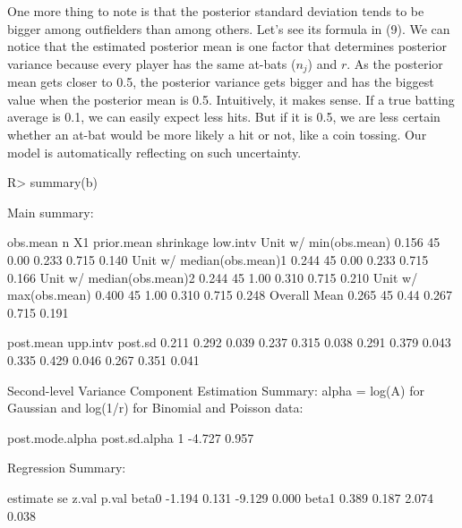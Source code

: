 \documentclass[article]{jss}
\begin{document}
One more thing to note is that the posterior standard deviation tends to be bigger among outfielders than among others. Let's see its formula in (9). We can notice that the estimated posterior mean is one factor that determines posterior variance because every player has the same at-bats ($n_{j}$) and $r$. As the posterior mean gets closer to 0.5, the posterior variance gets bigger and has the biggest value when the posterior mean is 0.5. Intuitively, it makes sense. If a true batting average is 0.1, we can easily expect less hits. But if it is 0.5, we are less certain whether an at-bat would be more likely a hit or not, like a coin tossing. Our model is automatically reflecting on such uncertainty.
\begin{CodeChunk}
\begin{CodeInput}
R> summary(b)
\end{CodeInput}
\begin{CodeOutput}
Main summary:

                          obs.mean  n   X1 prior.mean shrinkage low.intv
Unit w/ min(obs.mean)        0.156 45 0.00      0.233     0.715    0.140
Unit w/ median(obs.mean)1    0.244 45 0.00      0.233     0.715    0.166
Unit w/ median(obs.mean)2    0.244 45 1.00      0.310     0.715    0.210
Unit w/ max(obs.mean)        0.400 45 1.00      0.310     0.715    0.248
Overall Mean                 0.265 45 0.44      0.267     0.715    0.191

                         post.mean upp.intv post.sd
                             0.211    0.292   0.039
                             0.237    0.315   0.038
                             0.291    0.379   0.043
                             0.335    0.429   0.046
                             0.267    0.351   0.041

Second-level Variance Component Estimation Summary:
alpha = log(A) for Gaussian and log(1/r) for Binomial and Poisson data:

  post.mode.alpha post.sd.alpha
1          -4.727         0.957


Regression Summary:

      estimate    se  z.val p.val
beta0   -1.194 0.131 -9.129 0.000
beta1    0.389 0.187  2.074 0.038
\end{CodeOutput}
\end{CodeChunk}
\end{document}
